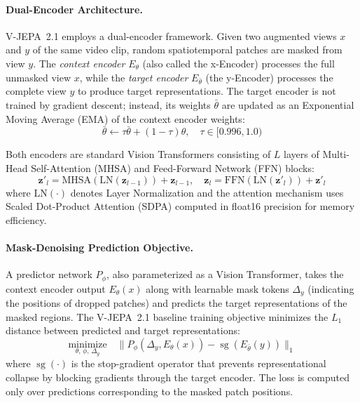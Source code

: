\paragraph{Dual-Encoder Architecture.}
V-JEPA~2.1 employs a dual-encoder framework. Given two augmented views $x$ and $y$ of the same video clip, random spatiotemporal patches are masked from view $y$. The \emph{context encoder} $E_\theta$ (also called the x-Encoder) processes the full unmasked view $x$, while the \emph{target encoder} $E_{\bar{\theta}}$ (the y-Encoder) processes the complete view $y$ to produce target representations. The target encoder is not trained by gradient descent; instead, its weights $\bar{\theta}$ are updated as an Exponential Moving Average (EMA) of the context encoder weights:
\begin{equation}
    \bar{\theta} \leftarrow \tau \bar{\theta} + (1 - \tau) \theta, \quad \tau \in [0.996, 1.0)
    \label{eq:vjepa_ema}
\end{equation}

Both encoders are standard Vision Transformers consisting of $L$ layers of Multi-Head Self-Attention (MHSA) and Feed-Forward Network (FFN) blocks:
\begin{equation}
    \mathbf{z}'_l = \text{MHSA}(\text{LN}(\mathbf{z}_{l-1})) + \mathbf{z}_{l-1}, \quad
    \mathbf{z}_l = \text{FFN}(\text{LN}(\mathbf{z}'_l)) + \mathbf{z}'_l
    \label{eq:vjepa_transformer}
\end{equation}
where $\text{LN}(\cdot)$ denotes Layer Normalization and the attention mechanism uses Scaled Dot-Product Attention (SDPA) computed in float16 precision for memory efficiency.

\paragraph{Mask-Denoising Prediction Objective.}
A predictor network $P_\phi$, also parameterized as a Vision Transformer, takes the context encoder output $E_\theta(x)$ along with learnable mask tokens $\Delta_y$ (indicating the positions of dropped patches) and predicts the target representations of the masked regions. The V-JEPA~2.1 baseline training objective minimizes the $L_1$ distance between predicted and target representations:
\begin{equation}
    \underset{\theta,\,\phi,\,\Delta_y}{\text{minimize}} \quad \|P_\phi(\Delta_y, E_\theta(x)) - \operatorname{sg}(E_{\bar{\theta}}(y))\|_1
    \label{eq:vjepa2_obj}
\end{equation}
where $\operatorname{sg}(\cdot)$ is the stop-gradient operator that prevents representational collapse by blocking gradients through the target encoder. The loss is computed only over predictions corresponding to the masked patch positions.

